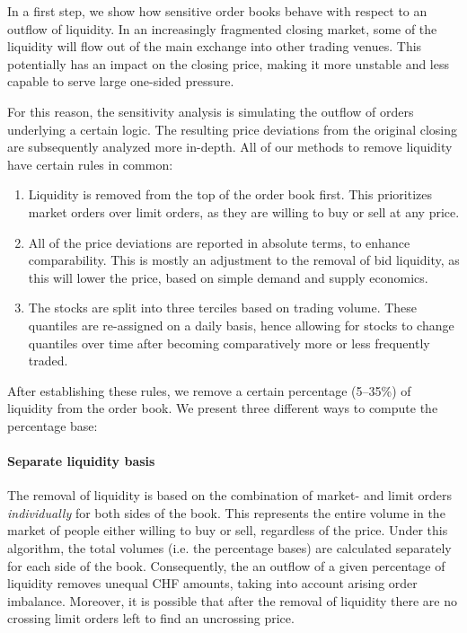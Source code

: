 \documentclass[11pt,a4paper, notitlepage]{article}
\begin{document}
	In a first step, we show how sensitive order books behave with respect to an outflow of liquidity. In an increasingly fragmented closing market, some of the liquidity will flow out of the main exchange into other trading venues. This potentially has an impact on the closing price, making it more unstable and less capable to serve large one-sided pressure.
	
	For this reason, the sensitivity analysis is simulating the outflow of orders underlying a certain logic. The resulting price deviations from the original closing are subsequently analyzed more in-depth. All of our methods to remove liquidity have certain rules in common:
	\begin{enumerate}
		\item Liquidity is removed from the top of the order book first. This prioritizes market orders over limit orders, as they are willing to buy or sell at any price.
		\item All of the price deviations are reported in absolute terms, to enhance comparability. This is mostly an adjustment to the removal of bid liquidity, as this will lower the price, based on simple demand and supply economics.
		\item  The stocks are split into three terciles based on trading volume. These quantiles are re-assigned on a daily basis, hence allowing for stocks to change quantiles over time after becoming comparatively more or less frequently traded.
	\end{enumerate}
	
	After establishing these rules, we remove a certain percentage (5--35\%) of liquidity from the order book. We present three different ways to compute the percentage base:
	
	\paragraph{Separate liquidity basis}
	The removal of liquidity is based on the combination of market- and limit orders \emph{individually} for both sides of the book. This represents the entire volume in the market of people either willing to buy or sell, regardless of the price. Under this algorithm, the total volumes (i.e. the percentage bases) are calculated separately for each side of the book. Consequently, the an outflow of a given percentage of liquidity removes unequal CHF amounts, taking into account arising order imbalance. Moreover, it is possible that after the removal of liquidity there are no crossing limit orders left to find an uncrossing price.
	
\end{document}
